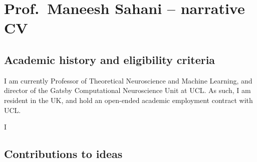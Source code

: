 % 
% 
% 
% 
% 
%

\section{Prof.\ Maneesh Sahani -- narrative CV}



\subsection{Academic history and eligibility criteria}

I am currently Professor of Theoretical Neuroscience and Machine Learning, and
director of the Gatsby Computational Neuroscience Unit at UCL.
%
As such, I am resident in the UK, and hold an open-ended academic
employment contract with UCL.

I 

% 

\subsection{Contributions to ideas}

